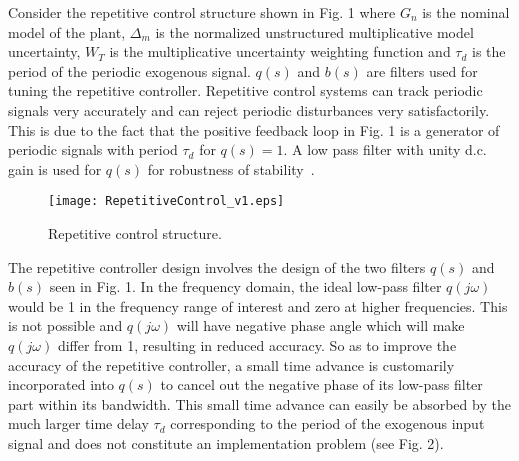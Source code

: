 \documentclass[12pt,draftcls,onecolumn]{IEEEtran}
\begin{document}
Consider the repetitive control structure shown in Fig. 1 where
$G_{n}$ is the nominal model of the plant, $\Delta_{m}$ is the
normalized unstructured multiplicative model uncertainty, $W_{T}$
is the multiplicative uncertainty weighting function and
$\tau_{d}$ is the period of the periodic exogenous signal. $q(s)$
and $b(s)$ are filters used for tuning the repetitive controller.
Repetitive control systems can track periodic signals very
accurately and can reject periodic disturbances very
satisfactorily. This is due to the fact that the positive feedback
loop in Fig. 1 is a generator of periodic signals with period
$\tau_{d}$ for $q(s)=1$. A low pass filter with unity d.c. gain is
used for $q(s)$ for robustness of stability~\cite{HYO+:88, WeH:99}.

\begin{figure}\centering
    \texttt{[image: RepetitiveControl\_v1.eps]}\\
    \caption{Repetitive control structure.}\end{figure}


The repetitive controller design involves the design of the two
filters $q(s)$ and $b(s)$ seen in Fig. 1. In the frequency domain,
the ideal low-pass filter $q(j\omega)$ would be 1 in the frequency
range of interest and zero at higher frequencies. This is not
possible and $q(j\omega)$ will have negative phase angle which
will make $q(j\omega)$ differ from 1, resulting in reduced
accuracy. So as to improve the accuracy of the repetitive
controller, a small time advance is customarily incorporated into
$q(s)$ to cancel out the negative phase of its low-pass filter
part within its bandwidth. This small time advance can easily be
absorbed by the much larger time delay $\tau_{d}$ corresponding to
the period of the exogenous input signal and does not constitute
an implementation problem (see Fig. 2).
\end{document}
